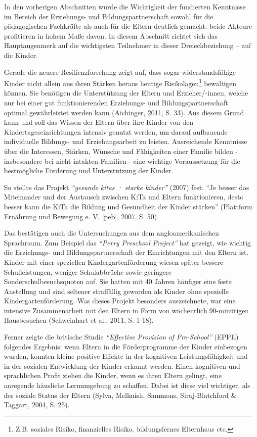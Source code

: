 \documentclass[12pt,a4paper]{article}
\begin{document}
In den vorherigen Abschnitten wurde die Wichtigkeit der fundierten Kenntnisse im Bereich der Erziehungs- und Bildungspartnerschaft sowohl für die pädagogischen Fachkräfte als auch für die Eltern deutlich gemacht: beide Akteure profitieren in hohem Maße davon. In diesem Abschnitt richtet sich das Hauptaugenmerk auf die wichtigsten Teilnehmer in dieser Dreieckbeziehung – auf die Kinder.

Gerade die neuere Resilienzforschung zeigt auf, dass sogar widerstandsfähige Kinder nicht allein aus ihren Stärken heraus heutige Risikolagen\footnote{Z.B. soziales Risiko, finanzielles Risiko, bildungsfernes Elternhaus etc.} bewältigen können. Sie benötigen die Unterstützung der Eltern und Erzieher/-innen, welche nur bei einer gut funktionierenden Erziehungs- und Bildungspartnerschaft optimal gewährleistet werden kann (Aichinger, 2011, S. 33). Aus diesem Grund kann und soll das Wissen der Eltern über ihre Kinder von den Kindertageseinrichtungen intensiv genutzt werden, um darauf aufbauende individuelle Bildungs- und Erziehungsarbeit zu leisten. Ausreichende Kenntnisse über die Interessen, Stärken, Wünsche und Fähigkeiten einer Familie bilden - insbesondere bei nicht intakten Familien - eine wichtige Voraussetzung für die bestmögliche Förderung und Unterstützung der Kinder.

	So stellte das Projekt \textit{"`gesunde kitas · starke kinder"'} (2007) fest: "`Je besser das Miteinander und der Austausch zwischen KiTa und Eltern funktionieren, desto besser kann die KiTa die Bildung und Gesundheit der Kinder stärken"' (Plattform Ernährung und Bewegung e. V. [peb], 2007, S. 50).
	
Das bestätigen auch die Untersuchungen aus dem angloamerikanischen Spra\-chraum. Zum Beispiel das \textit{"`Perry Preschool Project"'} hat gezeigt, wie wichtig die Erziehungs- und Bildungspartnerschaft der Einrichtungen mit den Eltern ist. Kinder mit einer speziellen Kindergartenförderung wiesen später bessere Schulleistungen, weniger Schulabbrüche sowie geringere Sonderschulbesuchsquoten auf. Sie hatten mit 40 Jahren häufiger eine feste Anstellung und sind seltener straffällig geworden als Kinder ohne spezielle Kindergartenförderung. Was dieses Projekt besonders auszeichnete, war eine intensive Zusammenarbeit mit den Eltern in Form von wöchentlich 90-minütigen Hausbesuchen (Schweinhart et al., 2011, S. 1-18).

Ferner zeigte die britische Studie \textit{"`Effective Provision of Pre-School"'} (EPPE) folgendes Ergebnis: wenn Eltern in die Förderprogramme der Kinder einbezogen wurden, konnten kleine positive Effekte in der kognitiven Leistungsfähigkeit und in der sozialen Entwicklung der Kinder erkannt werden. Einen kognitiven und sprachlichen Profit ziehen die Kinder, wenn es ihren Eltern gelingt, eine anregende häusliche Lernumgebung zu schaffen. Dabei ist diese viel wichtiger, als der soziale Status der Eltern (Sylva, Melhuish, Sammons, Siraj-Blatchford \& Taggart, 2004, S. 25).
\end{document}
